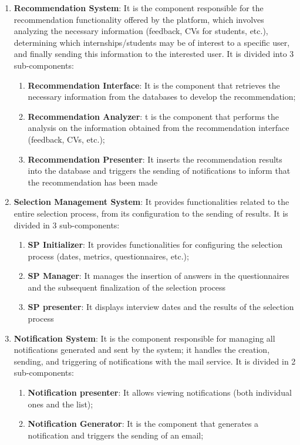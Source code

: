 \begin{enumerate}
					\item \textbf{Recommendation System}: It is the component responsible for the recommendation functionality offered by the platform, which involves analyzing the necessary information (feedback, CVs for students, etc.), determining which internships/students may be of interest to a specific user, and finally sending this information to the interested user. It is divided into 3 sub-components:
					\begin{enumerate}
						\item \textbf{Recommendation Interface}: It is the component that retrieves the necessary information from the databases to develop the recommendation;
						\item \textbf{Recommendation Analyzer}: t is the component that performs the analysis on the information obtained from the recommendation interface (feedback, CVs, etc.);
						\item \textbf{Recommendation Presenter}: It inserts the recommendation results into the database and triggers the sending of notifications to inform that the recommendation has been made
					\end{enumerate}
					
					\item \textbf{Selection Management System}: 
					It provides functionalities related to the entire selection process, from its configuration to the sending of results. It is divided in 3 sub-components:
					\begin{enumerate}
						\item \textbf{SP Initializer}: It provides functionalities for configuring the selection process (dates, metrics, questionnaires, etc.);
						\item \textbf{SP Manager}: It manages the insertion of answers in the questionnaires and the subsequent finalization of the selection process
						\item \textbf{SP presenter}: It displays interview dates and the results of the selection process
					\end{enumerate}
					
					\item \textbf{Notification System}: 
					It is the component responsible for managing all notifications generated and sent by the system; it handles the creation, sending, and triggering of notifications with the mail service. It is divided in 2 sub-components:
					\begin{enumerate}
						\item \textbf{Notification presenter}: It allows viewing notifications (both individual ones and the list);
						\item \textbf{Notification Generator}: It is the component that generates a notification and triggers the sending of an email;
					\end{enumerate}
			\end{enumerate}
			
